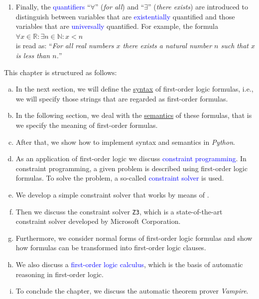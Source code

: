 \begin{enumerate}
      $x > 1 \rightarrow x + 7 < x \cdot  7$.
\item Finally, the \textcolor{blue}{quantifiers} ``$\forall$'' (\emph{for all}) and
      ``$\exists$'' (\emph{there exists}) are introduced to distinguish between variables that are
      \textcolor{blue}{existentially} quantified and those variables that are \textcolor{blue}{universally}
      quantified.  For example, the formula 
      \\[0.2cm]
      \hspace*{1.3cm}
      $\forall x \in \mathbb{R}: \exists n \in \mathbb{N}: x < n$
      \\[0.2cm]
      is read as: ``\textsl{For all real numbers $x$ there exists a natural number $n$ such that $x$ is less
        than $n$.}''
\end{enumerate}
This chapter is structured as follows:
\begin{enumerate}[(a)]
\item In the next section, we will define the \href{https://en.wikipedia.org/wiki/Syntax}{syntax} of
      first-order logic formulas, i.e., we will specify those strings that are regarded as first-order
      formulas.
\item In the following section, we deal with the
      \href{https://en.wikipedia.org/wiki/Semantics}{semantics} of these formulas, that is we specify the 
      meaning of first-order formulas.
\item After that, we show how to implement syntax and semantics in \textsl{Python}.
\item As an application of first-order logic we discuss \textcolor{blue}{constraint programming}.
      In constraint programming, a given problem is described using first-order logic formulas.
      To solve the problem, a so-called \textcolor{blue}{constraint solver} is used.
\item We develop a simple constraint solver that works by means of .
\item Then we discuss the constraint solver \texttt{Z3}, which is a state-of-the-art constraint solver
      developed by Microsoft Corporation.
\item Furthermore, we consider normal forms of first-order logic formulas and show how formulas
      can be transformed into first-order logic clauses.
\item We also discuss a \textcolor{blue}{first-order logic calculus}, which is the basis
      of automatic reasoning in first-order logic.
\item To conclude the chapter, we discuss the automatic theorem prover \textsl{Vampire}.
\end{enumerate}

